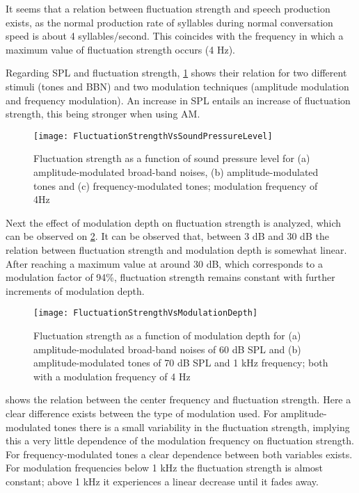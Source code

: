 \documentclass[../main.tex]{subfiles}
\begin{document}
\begin{theoreticalbackground}
It seems that a relation between fluctuation strength and speech production
exists, as the normal production rate of syllables during normal conversation
speed is about 4 syllables/second. This coincides with the frequency in which a
maximum value of fluctuation strength occurs (4 Hz).

Regarding \gls{SPL} and fluctuation strength, \cref{fig:flucstrenvsndpreslvl}
shows their relation for two different stimuli (tones and \gls{BBN}) and two
modulation techniques (amplitude modulation and frequency modulation). An
increase in \gls{SPL} entails an increase of fluctuation strength, this being
stronger when using \gls{AM}.

\begin{figure}
  \centering
  \texttt{[image: FluctuationStrengthVsSoundPressureLevel]}
  \caption{Fluctuation strength as a function of sound pressure level for (a)
    amplitude-modulated broad-band noises, (b) amplitude-modulated tones and (c)
    frequency-modulated tones; modulation frequency of
    4Hz~\cite[pp.~249]{Fastl2007Psychoacoustics}}
\label{fig:flucstrenvsndpreslvl}
\end{figure}

Next the effect of modulation depth on fluctuation strength is analyzed, which
can be observed on \cref{fig:flucstrenvsmoddep}. It can be observed that,
between 3 dB and 30 dB the relation between fluctuation strength and modulation
depth is somewhat linear. After reaching a maximum value at around 30 dB, which
corresponds to a modulation factor of 94\%, fluctuation strength remains
constant with further increments of modulation depth.

\begin{figure}
  \centering
  \texttt{[image: FluctuationStrengthVsModulationDepth]}
  \caption{Fluctuation strength as a function of modulation depth for (a)
    amplitude-modulated broad-band noises of 60 dB SPL and (b)
    amplitude-modulated tones of 70 dB SPL and 1 kHz frequency; both with a
    modulation frequency of 4 Hz~\cite[pp.~249]{Fastl2007Psychoacoustics}}
\label{fig:flucstrenvsmoddep}
\end{figure}

 shows the relation between the center
frequency and fluctuation strength. Here a clear difference exists between the
type of modulation used. For amplitude-modulated tones there is a small
variability in the fluctuation strength, implying this a very little dependence
of the modulation frequency on fluctuation strength. For frequency-modulated
tones a clear dependence between both variables exists. For modulation
frequencies below 1 kHz the fluctuation strength is almost constant; above 1 kHz
it experiences a linear decrease until it fades away.


\end{theoreticalbackground}
\end{document}
